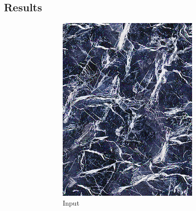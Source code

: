 \subsection{Results}
\label{section:results-experiments-02-results}

\begin{figure}[]
    \centering    
    \begin{subfigure}{\textwidth}
        \centering
        \begin{subfigure}{0.24\textwidth}
            \centering
            \includegraphics[width=\textwidth]{images/04-experiment02/human/marble/target.jpg}
            \caption{Input}
            \label{fig:ex02-human-marble-target}
        \end{subfigure}
        \hfill
        \begin{subfigure}{0.24\textwidth}
            \centering

\end{subfigure}
\end{subfigure}
\end{figure}

